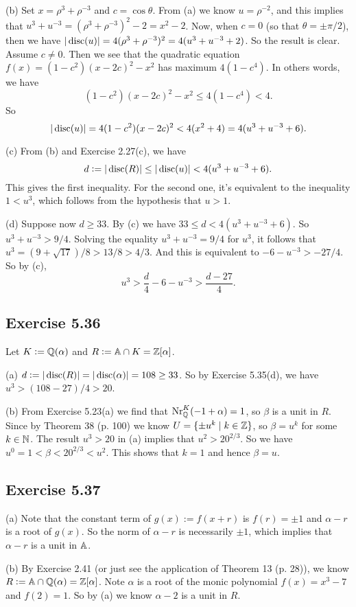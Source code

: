 \documentclass[../Marcus.tex]{subfiles}
\begin{document}
(b) Set $x=\rho^3+\rho^{-3}$ and $c=\cos\theta$. From (a) we know $u=\rho^{-2}$, and this implies that $u^3+u^{-3} = (\rho^3+\rho^{-3})^2-2 = x^2-2$. Now, when $c=0$ (so that $\theta=\pm\pi/2$), then we have $|\disc(u)| = 4(\rho^3+\rho^{-3})^2 = 4(u^3+u^{-3}+2)$. So the result is clear. Assume $c\neq0$. Then we see that the quadratic equation $f(x)=(1-c^2)(x-2c)^2-x^2$ has maximum $4(1-c^4)$. In others words, we have
$$
(1-c^2)(x-2c)^2-x^2 \leq 4(1-c^4) < 4.
$$
So
$$
|\disc(u)| = 4(1-c^2)(x-2c)^2 < 4(x^2+4) = 4(u^3+u^{-3} +6).
$$

(c) From (b) and Exercise 2.27(c), we have
$$
d := |\disc(R)| \leq |\disc(u)| < 4(u^3+u^{-3}+6).
$$
This gives the first inequality. For the second one, it's equivalent to the inequality $1<u^3$, which follows from the hypothesis that $u>1$.

(d) Suppose now $d\geq33$. By (c) we have $33 \leq d < 4(u^3+u^{-3}+6)$. So $u^3+u^{-3} > 9/4$. Solving the equality $u^3+u^{-3} = 9/4$ for $u^3$, it follows that $u^3 = (9+\sqrt{17})/8 > 13/8 > 4/3$. And this is equivalent to $-6-u^{-3} > -27/4$. So by (c),
$$
u^3 > \frac{d}{4} -6 - u^{-3} > \frac{d-27}{4}.
$$

\subsection*{Exercise 5.36}

Let $K:=\QQ(\alpha)$ and $R:=\AA \cap K = \ZZ[\alpha]$.

(a) $d := |\disc(R)| = |\disc(\alpha)| = 108 \geq 33$. So by Exercise 5.35(d), we have $u^3 > (108-27)/4 > 20$.

(b) From Exercise 5.23(a) we find that $\NrKQ(-1+\alpha) = 1$, so $\beta$ is a unit in $R$. Since by Theorem 38 (p. 100) we know $U = \{\pm u^k \mid k \in\ZZ\}$, so $\beta = u^k$ for some $k\in\NN$. The result $u^3 > 20$ in (a) implies that $u^2 > 20^{2/3}$. So we have $u^0 = 1 < \beta < 20^{2/3} < u^2$. This shows that $k=1$ and hence $\beta=u$.

\subsection*{Exercise 5.37}

(a) Note that the constant term of $g(x) := f(x+r)$ is $f(r) = \pm 1$ and $\alpha-r$ is a root of $g(x)$. So the norm of $\alpha-r$ is necessarily $\pm1$, which implies that $\alpha-r$ is a unit in $\AA$.

(b) By Exercise 2.41 (or just see the application of Theorem 13 (p. 28)), we know $R:= \AA\cap\QQ(\alpha) = \ZZ[\alpha]$. Note $\alpha$ is a root of the monic polynomial $f(x)=x^3-7$ and $f(2)=1$. So by (a) we know $\alpha-2$ is a unit in $R$.
\end{document}
